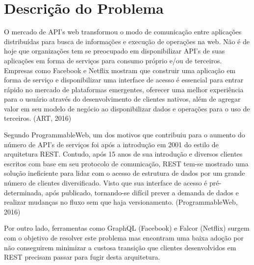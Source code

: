\section[Descrição do Problema]{Descrição do Problema}

O mercado de API's web transformou o modo de comunicação entre aplicações distribuídas para busca de informações e execução de operações na web. Não é de hoje que organizações tem se preocupado em disponibilizar API's de suas aplicações em forma de serviços para consumo próprio e/ou de terceiros. Empresas como Facebook e Netflix mostram que construir uma aplicação em forma de serviço e disponibilizar uma interface de acesso é essencial para entrar rápido no mercado de plataformas emergentes, oferecer uma melhor experiência para o usuário através do desenvolvimento de clientes nativos, além de agregar valor em seu modelo de negócio ao disponibilizar dados e operações para o uso de terceiros. (ART, 2016)

Segundo ProgrammableWeb, um dos motivos que contribuiu para o aumento do número de API's de serviços foi após a introdução em 2001 do estilo de arquitetura REST. Contudo, após 15 anos de sua introdução e diversos clientes escritos com base em seu protocolo de comunicação, REST tem-se mostrado uma solução ineficiente para lidar com o acesso de estrutura de dados por um grande número de clientes diversificado. Visto que sua interface de acesso é pré-determinada, após publicado, tornando-se difícil prever a demanda de dados e realizar mudanças no fluxo sem que haja versionamento. (ProgrammableWeb, 2016)

Por outro lado, ferramentas como GraphQL (Facebook) e Falcor (Netflix) surgem com o objetivo de resolver este problema mas encontram uma baixa adoção por não conseguirem minimizar a custosa transição que clientes desenvolvidos em REST precisam passar para fugir desta arquitetura.
